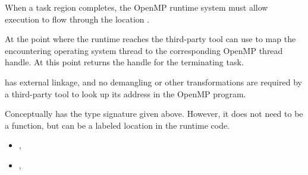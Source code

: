 \descr

When a task region completes, the OpenMP runtime system
must allow execution to flow through the location .

At the point where the runtime reaches 
the third-party tool can use
to map the encountering operating system thread to the corresponding
OpenMP thread handle.
At this point 
returns the handle for the terminating task.

\restrictions

 has external  linkage, and no
demangling or other transformations are required by a third-party tool
to look up its address in the OpenMP program.

Conceptually  has the type signature
given above.
However, it does not need to be a function, but can be a labeled location
in the runtime code.

\crossreferences
\begin{itemize}
\item
  , 
\item
  , 
\end{itemize}


